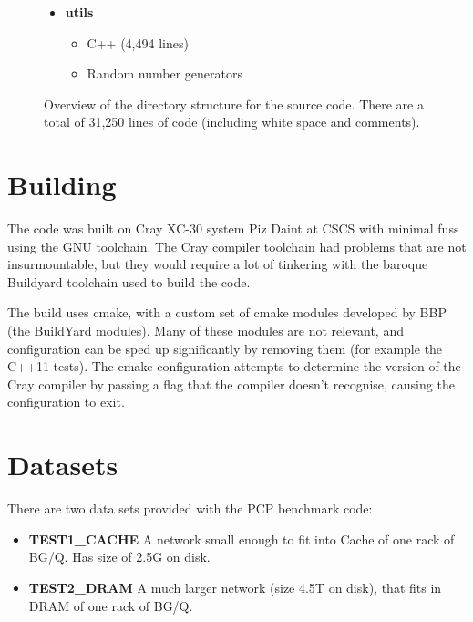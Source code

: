 \documentclass[11pt,a4paper]{article}
\begin{document}
\begin{figure}[tp!]
{{\begin{itemize}
    \item \textbf{utils}
    \begin{itemize}
        \item C++ (4,494 lines)
        \item Random number generators
    \end{itemize}
\end{itemize}

}}

\caption{Overview of the directory structure for the source code. There are a total of 31,250 lines of code (including white space and comments).}
\label{fig:DirectoryStructure}

\end{figure}

\section{Building}
The code was built on Cray XC-30 system Piz Daint at CSCS with minimal fuss using the GNU toolchain.
The Cray compiler toolchain had problems that are not insurmountable, but they would require a lot of tinkering with the baroque Buildyard toolchain used to build the code.

The build uses cmake, with a custom set of cmake modules developed by BBP (the BuildYard modules). Many of these modules are not relevant, and configuration can be sped up significantly by removing them (for example the C++11 tests). The cmake configuration attempts to determine the version of the Cray compiler by passing a flag that the compiler doesn't recognise, causing the configuration to exit.

\section{Datasets}
There are two data sets provided with the PCP benchmark code:
\begin{itemize}
    \item \textbf{TEST1\_CACHE} A network small enough to fit into Cache of one rack of BG/Q. Has size of 2.5G on disk.
    \item \textbf{TEST2\_DRAM} A much larger network (size 4.5T on disk), that fits in DRAM of one rack of BG/Q.
\end{itemize}
\end{document}
